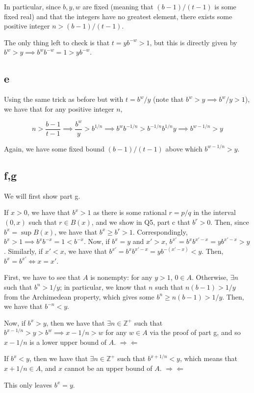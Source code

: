 \documentclass[12pt,letterpaper]{article}
\theoremstyle{definition}
\newcommand{\contra}{\Rightarrow\!\Leftarrow}
\newcommand{\Z}{\mathbb{Z}}
\begin{document}
In particular, since $b, y, w$ are fixed (meaning that $(b-1) / (t-1)$ is some
fixed real) and that the integers have no greatest
element, there exists some positive integer $n > (b-1) / (t-1)$.

The only thing left to check is that $t = yb^{-w} > 1$, but this is directly
given by $b^w > y \implies b^{w}b^{-w} = 1 > yb^{-w}$.

\subsection*{e}

Using the same trick as before but with $t = b^w / y$ (note that $b^w > y
\implies b^w / y > 1$), we have that for any
positive integer $n$,

\[
  n > \frac{b-1}{t-1} \implies \frac{b^{w}}{y} > b^{1 / n} \implies b^{w}b^{- 1
  / n} > b^{-1 / n}b^{1 / n}y \implies b^{w - 1 / n} > y
\]

Again, we have some fixed bound $(b-1) / (t-1)$ above which $b^{w - 1 / n} > y$.

\subsection*{f,g}

We will first show part g.

If $x > 0$, we have that $b^x > 1$ as there is some rational $r = p / q$ in the
interval $(0, x)$ such that $r \in B(x)$, and we show in Q5, part c that $b^r >
0$. Then, since $b^x = \sup B(x)$, we have that $b^x \geq b^r > 1$.
Correspondingly, $b^x > 1 \implies b^xb^{-x} = 1 < b^{-x}$. Now, if $b^x
= y$ and $x' > x$, $b^{x'} = b^xb^{x'-x} = yb^{x'-x} > y$. Similarly, if $x' <
x$, we have that $b^{x'} = b^xb^{x'-x} = yb^{-(x'-x)} < y$. Then, $b^x = b^{x'}
\iff x = x'$.


First, we have to see that $A$ is nonempty: for any $y > 1$, $0 \in A$.
Otherwise, $\exists n$ such
that $b^n > 1 / y$; in particular, we know that $n$ such that $n(b - 1) > 1 / y$ from
the Archimedean property, which gives some $b^n \geq n(b-1) > 1 / y$. Then, we have
that $b^{-n} < y$.

Now, if $b^x > y$, then we have that $\exists n \in \Z^+$ such that $b^{x - 1 / n}
> y > b^w \implies x - 1 / n > w$ for any $w \in A$ via the proof of part g, and so $x - 1 / n$ is a lower upper bound of $A$.
$\contra$

If $b^x < y$, then we have that $\exists n \in \Z^+$ such that $b^{x + 1 / n} <
y$, which means that $x + 1 / n \in A$, and $x$ cannot be an upper bound of $A$.
$\contra$

This only leaves $b^x = y$.
\end{document}
